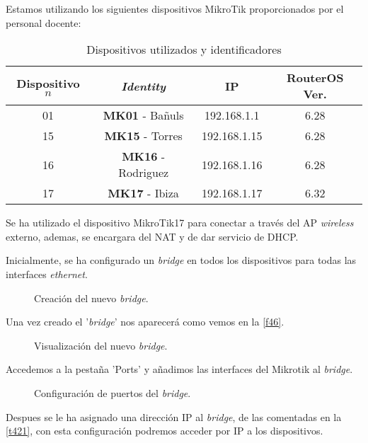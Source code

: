 Estamos utilizando los siguientes dispositivos MikroTik proporcionados por el personal docente:
\begin{table}[ht!]
	\begin{center}
		\caption{Dispositivos utilizados y identificadores}
		\label{t421}
		\begin{tabular}{*4c} \toprule \textbf{Dispositivo $n$} & \textit{\textbf{Identity}} & \textbf{IP} & \textbf{RouterOS Ver.} \\ \toprule
01 & \textbf{MK01} - Bañuls & 192.168.1.1 & 6.28 \\
15 & \textbf{MK15} - Torres & 192.168.1.15 & 6.28 \\
16 & \textbf{MK16} - Rodriguez & 192.168.1.16 & 6.28 \\
17 & \textbf{MK17} - Ibiza & 192.168.1.17 & 6.32 \\
			\toprule
		\end{tabular}
	\end{center}
\end{table}

Se ha utilizado el dispositivo MikroTik17 para conectar a través del AP \textit{wireless} externo, ademas, se encargara del NAT y de dar servicio de DHCP.

Inicialmente, se ha configurado un \textit{bridge} en todos los dispositivos para todas las interfaces \textit{ethernet}.

\begin{figure}[h!]\centering
	\caption{Creación del nuevo \textit{bridge}.}
	\label{birdge1}
	\bigskip
\end{figure}

Una vez creado el '\textit{bridge}' nos aparecerá como vemos en la \autoref{f46}.

\begin{figure}[h!]\centering
	\caption{Visualización del nuevo \textit{bridge}.}
	\label{f46}
	\bigskip
\end{figure}

Accedemos a la pestaña 'Ports' y añadimos las interfaces del Mikrotik al \textit{bridge}.
\begin{figure}[h!]\centering
	\caption{Configuración de puertos del \textit{bridge}.}
	\label{f48}
	\bigskip
\end{figure}

Despues se le ha asignado una dirección IP al \textit{bridge}, de las comentadas en la \autoref{t421}, con esta configuración podremos acceder por IP a los dispositivos.

